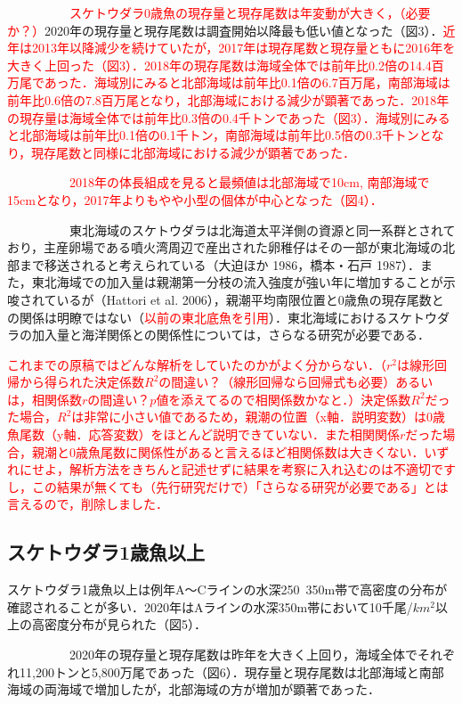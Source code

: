 \documentclass[11pt]{article} %
\begin{document}
\begin{linenumbers}
\ \ \ \ \ \ \ \ \ \ 
\textcolor{red}{スケトウダラ0歳魚の現存量と現存尾数は年変動が大きく，（必要か？）}2020年の現存量と現存尾数は調査開始以降最も低い値となった（図3）．\textcolor{red}{近年は2013年以降減少を続けていたが，2017年は現存尾数と現存量ともに2016年を大きく上回った（図3）．2018年の現存尾数は海域全体では前年比0.2倍の14.4百万尾であった．海域別にみると北部海域は前年比0.1倍の6.7百万尾，南部海域は前年比0.6倍の7.8百万尾となり，北部海域における減少が顕著であった．2018年の現存量は海域全体では前年比0.3倍の0.4千トンであった（図3）．海域別にみると北部海域は前年比0.1倍の0.1千トン，南部海域は前年比0.5倍の0.3千トンとなり，現存尾数と同様に北部海域における減少が顕著であった．}

\ \ \ \ \ \ \ \ \ \ 
\textcolor{red}{2018年の体長組成を見ると最頻値は北部海域で10cm, 南部海域で15cmとなり，2017年よりもやや小型の個体が中心となった（図4）．}

\ \ \ \ \ \ \ \ \ \ 
東北海域のスケトウダラは北海道太平洋側の資源と同一系群とされており，主産卵場である噴火湾周辺で産出された卵稚仔はその一部が東北海域の北部まで移送されると考えられている（大迫ほか 1986，橋本・石戸 1987）．また，東北海域での加入量は親潮第一分枝の流入強度が強い年に増加することが示唆されているが（Hattori et al. 2006），親潮平均南限位置と0歳魚の現存尾数との関係は明瞭ではない（\textcolor{red}{以前の東北底魚を引用}）．東北海域におけるスケトウダラの加入量と海洋関係との関係性については，さらなる研究が必要である．

\textcolor{red}{これまでの原稿ではどんな解析をしていたのかがよく分からない．（$r^2$は線形回帰から得られた決定係数$R^2$の間違い？（線形回帰なら回帰式も必要）あるいは，相関係数$r$の間違い？$p$値を添えてるので相関係数かなと．）決定係数$R^2$だった場合，$R^2$は非常に小さい値であるため，親潮の位置（x軸．説明変数）は0歳魚尾数（y軸．応答変数）をほとんど説明できていない．また相関関係$r$だった場合，親潮と0歳魚尾数に関係性があると言えるほど相関係数は大きくない．いずれにせよ，解析方法をきちんと記述せずに結果を考察に入れ込むのは不適切ですし，この結果が無くても（先行研究だけで）「さらなる研究が必要である」とは言えるので，削除しました．}

\subsection{スケトウダラ1歳魚以上}
スケトウダラ1歳魚以上は例年A〜Cラインの水深250~350m帯で高密度の分布が確認されることが多い．2020年はAラインの水深350m帯において10千尾/$km^2$以上の高密度分布が見られた（図5）．

\ \ \ \ \ \ \ \ \ \ 
2020年の現存量と現存尾数は昨年を大きく上回り，海域全体でそれぞれ11,200トンと5,800万尾であった（図6）．現存量と現存尾数は北部海域と南部海域の両海域で増加したが，北部海域の方が増加が顕著であった．


\end{linenumbers}
\end{document}
